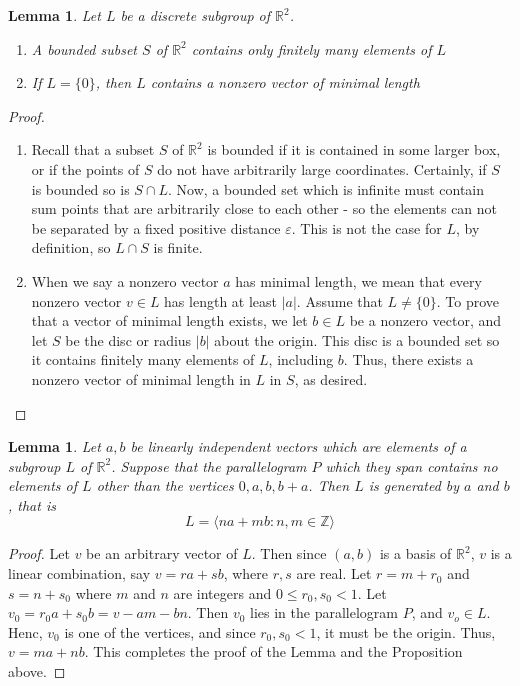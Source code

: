 \documentclass[12pt]{article}
\newtheorem{lem}[thm]{Lemma}  %
\theoremstyle{definition}
\theoremstyle{remark}
\numberwithin{equation}{section}
\newcommand\R{\mathbb R}    %
\newcommand\Z{\mathbb Z}    %
\begin{document}
\vspace{15pt}

\begin{lem}
        Let $L$ be a discrete subgroup of $\R^2$. \begin{enumerate}
                \item A bounded subset $S$ of $\R^2$ contains only finitely many elements of $L$
                \item If $L = \{0\}$, then $L$ contains a nonzero vector of minimal length
        \end{enumerate}
\end{lem}

\begin{proof}
        \begin{enumerate}
                \item Recall that a subset $S$ of $\R^2$ is bounded if it is contained in some larger box, or if the points of $S$ do not have arbitrarily large coordinates. Certainly, if $S$ is bounded so is $S \cap L$. Now, a bounded set which is infinite must contain sum points that are arbitrarily close to each other - so the elements can not be separated by a fixed positive distance $\varepsilon$. This is not the case for $L$, by definition, so $L\cap S$ is finite.
                \item When we say a nonzero vector $a$ has minimal length, we mean that every nonzero vector $v \in L$ has length at least $|a|$. Assume that $L \neq \{0\}$. To prove that a vector of minimal length exists, we let $b \in L$ be a nonzero vector, and let $S$ be the disc or radius $|b|$ about the origin. This disc is a bounded set so it contains finitely many elements of $L$, including $b$. Thus, there exists a nonzero vector of minimal length in $L$ in $S$, as desired.
        \end{enumerate}
\end{proof}

\vspace{15pt}

\begin{lem}
        Let $a,b$ be linearly independent vectors which are elements of a subgroup $L$ of $\R^2$. Suppose that the parallelogram $P$ which they span contains no elements of $L$ other than the vertices $0,a,b,b+a$. Then $L$ is generated by $a$ and $b$, that is \begin{equation}
                L = \langle na + mb: n,m \in \Z\rangle
        \end{equation}
\end{lem}
\begin{proof}
        Let $v$ be an arbitrary vector of $L$. Then since $(a,b)$ is a basis of $\R^2$, $v$ is a linear combination, say $v =ra+sb$, where $r,s$ are real. Let $r = m+r_0$ and $s= n+s_0$ where $m$ and $n$ are integers and $0\leq r_0,s_0 < 1$. Let $v_0 = r_0a+s_0b = v-am-bn$. Then $v_0$ lies in the parallelogram $P$, and $v_o \in L$. Henc, $v_0$ is one of the vertices, and since $r_0,s_0 <1$, it must be the origin. Thus, $v = ma+nb$. This completes the proof of the Lemma and the Proposition above.
\end{proof}
\end{document}
